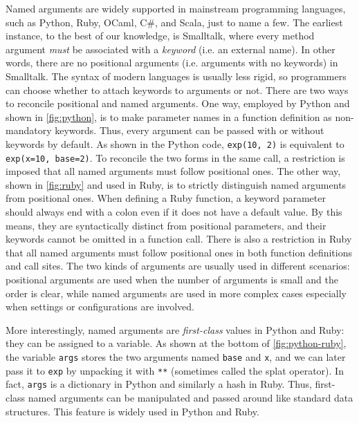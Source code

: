 Named arguments are widely supported in mainstream programming languages, such
as Python, Ruby, OCaml, C\#, and Scala, just to name a few. The earliest
instance, to the best of our knowledge, is Smalltalk, where every method
argument \emph{must} be associated with a \emph{keyword} (i.e. an external
name). In other words, there are no positional arguments (i.e. arguments with no
keywords) in Smalltalk. The syntax of modern languages is usually less rigid, so
programmers can choose whether to attach keywords to arguments or not. There are
two ways to reconcile positional and named arguments. One way, employed by
Python and shown in \autoref{fig:python}, is to make parameter names in a
function definition as non-mandatory keywords. Thus, every argument can be
passed with or without keywords by default. As shown in the Python code,
\lstinline{exp(10, 2)} is equivalent to \lstinline{exp(x=10, base=2)}. To
reconcile the two forms in the same call, a restriction is imposed that all
named arguments must follow positional ones. The other way, shown in
\autoref{fig:ruby} and used in Ruby, is to strictly distinguish named arguments
from positional ones. When defining a Ruby function, a keyword parameter should
always end with a colon even if it does not have a default value. By this means,
they are syntactically distinct from positional parameters, and their keywords
cannot be omitted in a function call. There is also a restriction in Ruby that
all named arguments must follow positional ones in both function definitions and
call sites. The two kinds of arguments are usually used in different scenarios:
positional arguments are used when the number of arguments is small and the
order is clear, while named arguments are used in more complex cases especially
when settings or configurations are involved.

More interestingly, named arguments are \emph{first-class} values in Python and
Ruby: they can be assigned to a variable. As shown at the bottom of
\autoref{fig:python-ruby}, the variable \lstinline{args} stores the two
arguments named \lstinline{base} and \lstinline{x}, and we can later pass it to
\lstinline{exp} by unpacking it with \lstinline{**} (sometimes called the splat
operator). In fact, \lstinline{args} is a dictionary in Python and similarly a
hash in Ruby. Thus, first-class named arguments can be manipulated and passed
around like standard data structures. This feature is widely used in Python and
Ruby.

